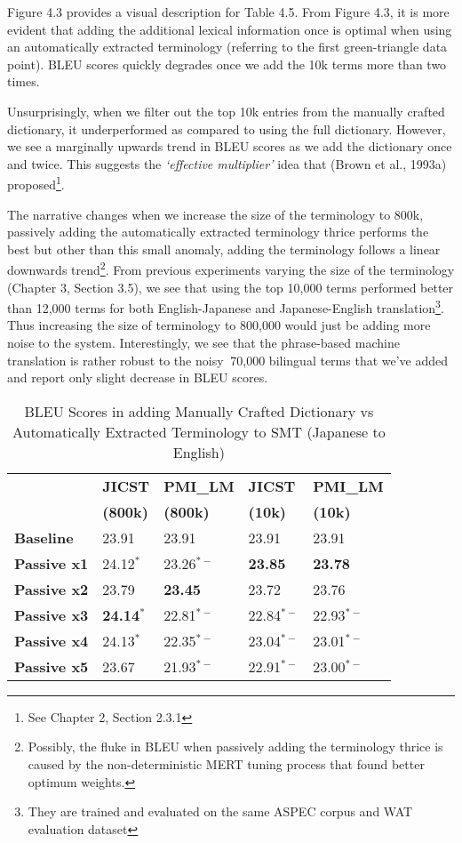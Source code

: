 Figure 4.3 provides a visual description for Table 4.5. From Figure 4.3, it is more evident that adding the additional lexical information once is optimal when using an automatically extracted terminology (referring to the first green-triangle data point). BLEU scores quickly degrades once we add the 10k terms  more than two times. 

Unsurprisingly, when we filter out the top 10k entries from the manually crafted dictionary, it underperformed as compared to using the full dictionary. However, we see a marginally upwards trend in BLEU scores as we add the dictionary once and twice. This suggests the \textit{`effective multiplier'} idea that (Brown et al., 1993a) proposed\footnote{See Chapter 2, Section 2.3.1}.

The narrative changes when we increase the size of the terminology to 800k, passively adding the automatically extracted terminology thrice performs the best but other than this small anomaly, adding the  terminology follows a linear downwards trend\footnote{Possibly, the fluke in BLEU when passively adding the terminology thrice is caused by the non-deterministic MERT tuning process that found better optimum weights.}. From previous experiments varying the size of the terminology (Chapter 3, Section 3.5), we see that using the top 10,000 terms performed better than 12,000 terms for both English-Japanese and Japanese-English translation\footnote{They are trained and evaluated on the same ASPEC corpus and WAT evaluation dataset}. Thus increasing the size of terminology to 800,000 would just be adding more noise to the system. Interestingly, we see that the phrase-based machine translation is rather robust to the noisy $~$70,000 bilingual terms that we've added and report only slight decrease in BLEU scores. 

\begin{table}[H]
\centering
    \begin{tabular}{l|ll|ll}
               & \textbf{JICST} & \textbf{PMI\_LM} & \textbf{JICST} & \textbf{PMI\_LM} \\ 
               & \textbf{(800k)} & \textbf{(800k)} & \textbf{(10k)} & \textbf{(10k)} \\ \hline
 \textbf{Baseline}  & 23.91 &23.91  & 23.91 & 23.91 \\ \hline
    \textbf{Passive x1} & 24.12$^{*}$        & 23.26$^{*-}$          & \textbf{23.85}       & \textbf{23.78}        \\
   \textbf{Passive x2} & 23.79        & \textbf{23.45}          & 23.72       & 23.76      \\
    \textbf{Passive x3} & \textbf{24.14$^{*}$ }       & 22.81$^{*-}$          & 22.84$^{*-}$       & 22.93$^{*-}$       \\
    \textbf{Passive x4} & 24.13$^{*}$        & 22.35$^{*-}$          & 23.04$^{*-}$       & 23.01$^{*-}$         \\
    \textbf{Passive x5} & 23.67        & 21.93$^{*-}$          & 22.91$^{*-}$       & 23.00$^{*-}$   
    \end{tabular}
    \caption{BLEU Scores in adding Manually Crafted Dictionary vs Automatically Extracted Terminology to SMT (Japanese to English)}
\label{table:watlmpmijaen}
\end{table}

